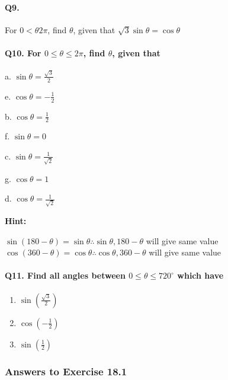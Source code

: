 \documentclass{article}
\begin{document}
\paragraph{Q9.}
For $0<\theta2\pi$, find $\theta$, given that $\sqrt{3}\sin\theta = \cos\theta$

\paragraph {Q10. For $0\leq\theta\leq2\pi$, find $\theta$, given that}
\begin{enumerate}
        \begin{paracol}{3}
          \item[a.] $\sin\theta = \frac{\sqrt{3}}{2}$
          \item[e.] $\cos\theta = -\frac{1}{2}$
          \switchcolumn
          \item[b.] $\cos\theta = \frac{1}{2}$
          \item[f.] $\sin\theta = 0$
          \switchcolumn
          \item[c.] $\sin\theta = \frac{1}{\sqrt{2}}$
          \item[g.] $\cos\theta = 1$
          \switchcolumn
          \item[d.] $\cos\theta = \frac{1}{\sqrt{2}}$
        \end{paracol}
\end{enumerate}

{\scriptsize \textbf{Hint:}}

$\sin(180-\theta) = \sin\theta \therefore \sin\theta, 180-\theta$ will give same value \\

$\cos(360-\theta) = \cos\theta \therefore \cos\theta, 360-\theta$ will give same value

\paragraph{Q11. Find all angles between $0\leq\theta\leq720^{\circ}$ which have}
\begin{enumerate}[label=\alph*)]
          \item $\sin(\frac{\sqrt{3}}{2})$
          \item $\cos(-\frac{1}{2})$
          \item $\sin(\frac{1}{2})$
\end{enumerate}

\subsubsection {Answers to Exercise 18.1}
\end{document}
